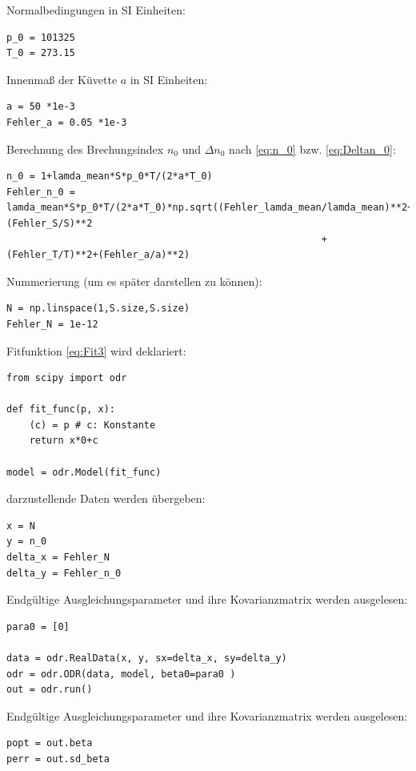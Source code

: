 \documentclass[a4paper,10pt]{article}
\begin{document}
Normalbedingungen in SI Einheiten:
\begin{lstlisting}
p_0 = 101325
T_0 = 273.15

\end{lstlisting}

Innenmaß der Küvette \( a\) in SI Einheiten:
\begin{lstlisting}
a = 50 *1e-3
Fehler_a = 0.05 *1e-3

\end{lstlisting}

Berechnung des Brechungsindex  \(n_0\) und \(\Delta n_0\) nach \eqref{eq:n_0} bzw. \eqref{eq:Deltan_0}:\begin{lstlisting}
n_0 = 1+lamda_mean*S*p_0*T/(2*a*T_0)
Fehler_n_0 = lamda_mean*S*p_0*T/(2*a*T_0)*np.sqrt((Fehler_lamda_mean/lamda_mean)**2+(Fehler_S/S)**2
                                                       +(Fehler_T/T)**2+(Fehler_a/a)**2)

\end{lstlisting} 

Nummerierung (um es später darstellen zu können): \begin{lstlisting}
N = np.linspace(1,S.size,S.size)
Fehler_N = 1e-12

\end{lstlisting}

Fitfunktion \eqref{eq:Fit3} wird deklariert:\begin{lstlisting}
from scipy import odr

def fit_func(p, x):
    (c) = p # c: Konstante
    return x*0+c

model = odr.Model(fit_func)

\end{lstlisting}

darzustellende Daten werden übergeben:\begin{lstlisting}
x = N
y = n_0
delta_x = Fehler_N
delta_y = Fehler_n_0

\end{lstlisting}

Endgültige Ausgleichungsparameter und ihre Kovarianzmatrix werden ausgelesen:\begin{lstlisting}
para0 = [0]

data = odr.RealData(x, y, sx=delta_x, sy=delta_y)
odr = odr.ODR(data, model, beta0=para0 )
out = odr.run()

\end{lstlisting}

Endgültige Ausgleichungsparameter und ihre Kovarianzmatrix werden ausgelesen:\begin{lstlisting}
popt = out.beta
perr = out.sd_beta

\end{lstlisting}
\end{document}
